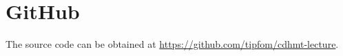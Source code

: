 \documentclass[aps,pra,showpacs,preprintnumbers,amsmath,amssymb,footinbib]{revtex4-2}
\begin{document}
    \appendix
    
    \section{GitHub}

    The source code can be obtained at \url{https://github.com/tipfom/cdhmt-lecture}.

     
\end{document}

